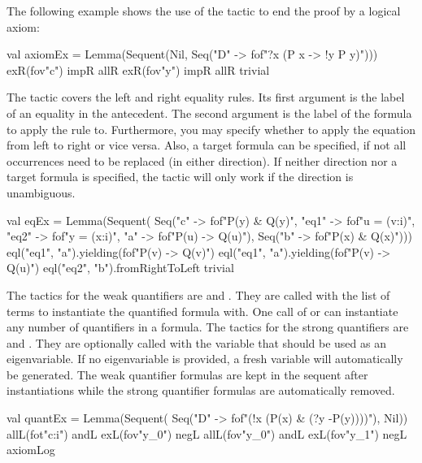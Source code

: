 \documentclass[a4paper,11pt]{book}
\newcommand{\cli}[1]{{\ttfamily {#1}}}
\begin{document}
The following example shows the use of the \cli{trivial} tactic to end the proof by a logical axiom:
\begin{tacticslisting}
  val axiomEx =
  Lemma(Sequent(Nil,
  Seq("D" -> fof"?x (P x -> !y P y)"))) {
      exR(fov"c")
      impR
      allR
      exR(fov"y")
      impR
      allR
      trivial
    }
\end{tacticslisting}
\begin{tacticsoutput}

\end{tacticsoutput}

The tactic \cli{eql} covers the left and right equality rules. Its first argument
is the label of an equality in the antecedent. The second argument is the label
of the formula to apply the rule to. Furthermore, you may specify whether to
apply the equation from left to right or vice versa. Also, a target formula can be
specified, if not all occurrences need to be replaced (in either direction).
If neither direction nor a target formula is specified, the tactic will only
work if the direction is unambiguous.

\begin{tacticslisting}
  val eqEx = Lemma(Sequent(
  Seq("c" -> fof"P(y) & Q(y)",
  "eq1" -> fof"u = (v:i)",
  "eq2" -> fof"y = (x:i)",
  "a" -> fof"P(u) -> Q(u)"),
  Seq("b" -> fof"P(x) & Q(x)"))) {
      eql("eq1", "a").yielding(fof"P(v) -> Q(v)")
      eql("eq1", "a").yielding(fof"P(v) -> Q(u)")
      eql("eq2", "b").fromRightToLeft
      trivial
    }
\end{tacticslisting}
\begin{tacticsoutput}

\end{tacticsoutput}

The tactics for the weak quantifiers are \cli{allL} and \cli{exR}. They are
called with the list of terms to instantiate the quantified formula with. One
call of \cli{allL} or \cli{exR} can instantiate any number of quantifiers in a
formula. The tactics for the strong quantifiers are \cli{allR} and \cli{exL}.
They are optionally called with the variable that should be used as an
eigenvariable. If no eigenvariable is provided, a fresh variable will
automatically be generated. The weak quantifier formulas are kept in the
sequent after instantiations while the strong quantifier formulas are
automatically removed.
\begin{tacticslisting}
  val quantEx = Lemma(Sequent(
  Seq("D" -> fof"(!x (P(x) & (?y -P(y))))"),
  Nil)) {
      allL(fot"c:i")
      andL
      exL(fov"y_0")
      negL
      allL(fov"y_0")
      andL
      exL(fov"y_1")
      negL
      axiomLog
    }
\end{tacticslisting}
\begin{tacticsoutput}

\end{tacticsoutput}
\end{document}
